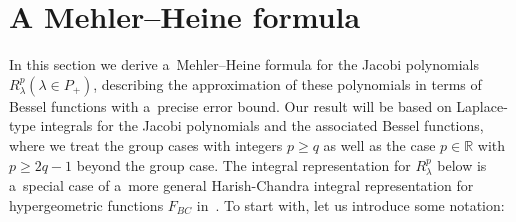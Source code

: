 \documentclass[pdftex]{sigma}
\numberwithin{equation}{section}
\begin{document}
\section{A Mehler--Heine formula}\label{Section2}

In this section we derive a~Mehler--Heine formula for the Jacobi polynomials $R_\lambda^p (\lambda \in P_+)$, describing
the approximation of these polynomials in terms of Bessel functions with a~precise error bound.
Our result will be based on Laplace-type integrals for the Jacobi polynomials and the associated Bessel functions, where
we treat the group cases with integers $p\ge q$ as well as the case $p\in\mathbb R$ with $p\ge 2q-1$ beyond the group
case.
The integral representation for $R_{\lambda}^p$ below is a~special case of a~more general Harish-Chandra integral
representation for hypergeometric functions $F_{BC}$ in~\cite{RV2}.
To start with, let us introduce some notation:
\end{document}
